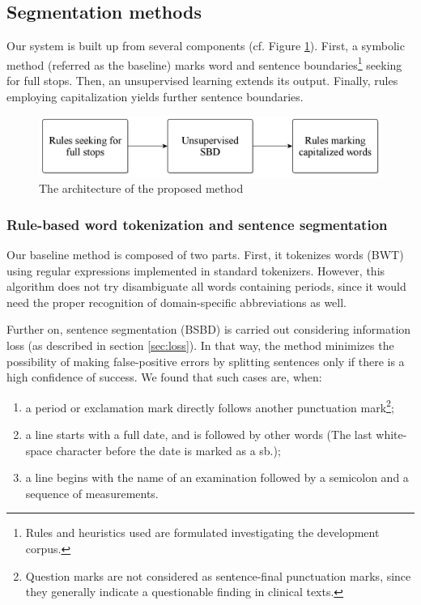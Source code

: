 \subsection{Segmentation methods}
\label{sec:clinical_segmentation}

Our system is built up from several components (cf. Figure \ref{fig:clin-segment-arch}). 
First, a symbolic method (referred as the baseline) marks word and sentence boundaries\footnote{Rules and heuristics used are formulated investigating the development corpus.} seeking for full stops. 
Then, an unsupervised learning extends its output.
Finally, rules employing capitalization yields further sentence boundaries.

\begin{figure}[H]
  \centering
  \includegraphics[scale=0.2]{Clinical/clin_segm_arch.png} 
  \caption{The architecture of the proposed method}
  \label{fig:clin-segment-arch}
\end{figure}

\subsubsection{Rule-based word tokenization and sentence segmentation}

Our baseline method is composed of two parts. 
First, it tokenizes words (BWT) using regular expressions implemented in standard tokenizers. %
However, this algorithm does not try disambiguate all words containing periods, since it would need the proper recognition of domain-specific abbreviations as well. %

Further on, sentence segmentation (BSBD) is carried out considering information loss (as described in section \ref{sec:loss}). 
In that way, the method minimizes the possibility of making false-positive errors by splitting sentences only if there is a high confidence of success. 
We found that such cases are, when:
\begin{enumerate} 
 \item a period or exclamation mark directly follows another punctuation mark\footnote{Question marks are not considered as sentence-final punctuation marks, since they generally indicate a questionable finding in clinical texts.};
 \item a line starts with a full date, and is followed by other words (The last white-space character before the date is marked as a \gls{sb}.);
 \item a line begins with the name of an examination followed by a semicolon and a sequence of measurements.
\end{enumerate}

